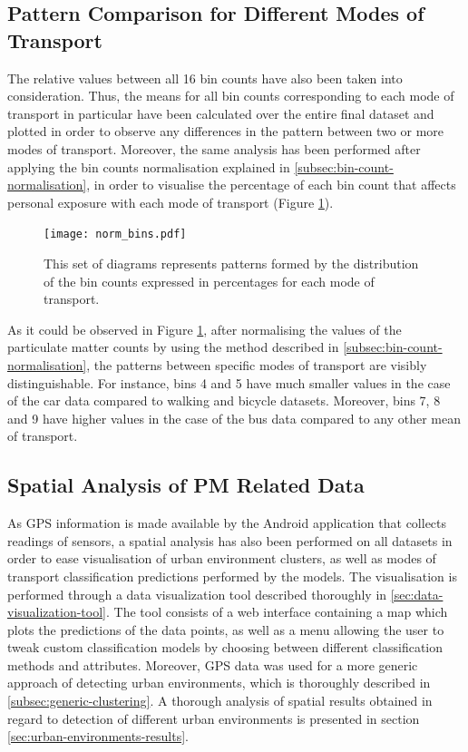 \documentclass[bsc,frontabs,twoside,singlespacing, parskip,deptreport]{infthesis}     %
\begin{document}
\subsection{Pattern Comparison for Different Modes of Transport}

The relative values between all 16 bin counts have also been taken into consideration. Thus, the means for all bin counts corresponding to each mode of transport in particular have been calculated over the entire final dataset and plotted in order to observe any differences in the pattern between two or more modes of transport. Moreover, the same analysis has been performed after applying the bin counts normalisation explained in \ref{subsec:bin-count-normalisation}, in order to visualise the percentage of each bin count that affects personal exposure with each mode of transport (Figure \ref{fig:norm-bins}).

\begin{figure}[h!]
  \center
  \texttt{[image: norm\_bins.pdf]} 
  \caption{This set of diagrams represents patterns formed by the distribution of the bin counts expressed in percentages for each mode of transport.}
  \label{fig:norm-bins}
\end{figure}

As it could be observed in Figure \ref{fig:norm-bins}, after normalising the values of the particulate matter counts by using the method described in \ref{subsec:bin-count-normalisation}, the patterns between specific modes of transport are visibly distinguishable. For instance, bins 4 and 5 have much smaller values in the case of the car data compared to walking and bicycle datasets. Moreover, bins 7, 8 and 9 have higher values in the case of the bus data compared to any other mean of transport.

\subsection{Spatial Analysis of PM Related Data}

As GPS information is made available by the Android application that collects readings of sensors, a spatial analysis has also been performed on all datasets in order to ease visualisation of urban environment clusters, as well as modes of transport classification predictions performed by the models. The visualisation is performed through a data visualization tool described thoroughly in \ref{sec:data-visualization-tool}. The tool consists of a web interface containing a map which plots the predictions of the data points, as well as a menu allowing the user to tweak custom classification models by choosing between different classification methods and attributes. Moreover, GPS data was used for a more generic approach of detecting urban environments, which is thoroughly described in \ref{subsec:generic-clustering}. A thorough analysis of spatial results obtained in regard to detection of different urban environments is presented in section \ref{sec:urban-environments-results}.
\end{document}

